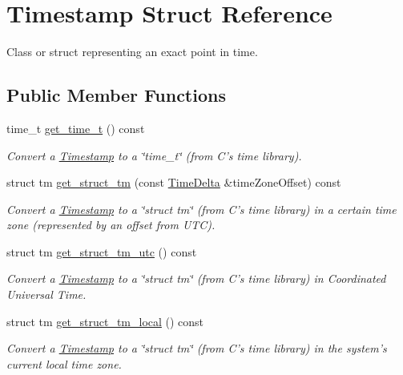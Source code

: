 \hypertarget{structTimestamp}{\section{Timestamp Struct Reference}
\label{structTimestamp}
}


Class or struct representing an exact point in time.  


\subsection*{Public Member Functions}
\begin{DoxyCompactItemize}
\item 
time\-\_\-t \hyperlink{structTimestamp_a54782bcc812fdeea952ec0e0880aac5f}{get\-\_\-time\-\_\-t} () const 
\begin{DoxyCompactList}\small\item\em Convert a \hyperlink{structTimestamp}{Timestamp} to a \char`\"{}time\-\_\-t\char`\"{} (from C's time library). \end{DoxyCompactList}\item 
struct tm \hyperlink{structTimestamp_ad75f04af1d0b038a2d43b117f72dee65}{get\-\_\-struct\-\_\-tm} (const \hyperlink{structTimeDelta}{Time\-Delta} \&time\-Zone\-Offset) const 
\begin{DoxyCompactList}\small\item\em Convert a \hyperlink{structTimestamp}{Timestamp} to a \char`\"{}struct tm\char`\"{} (from C's time library) in a certain time zone (represented by an offset from U\-T\-C). \end{DoxyCompactList}\item 
struct tm \hyperlink{structTimestamp_a763f8ab757e5d6cfb45c7931f75c5654}{get\-\_\-struct\-\_\-tm\-\_\-utc} () const 
\begin{DoxyCompactList}\small\item\em Convert a \hyperlink{structTimestamp}{Timestamp} to a \char`\"{}struct tm\char`\"{} (from C's time library) in Coordinated Universal Time. \end{DoxyCompactList}\item 
struct tm \hyperlink{structTimestamp_abc2107430b61e373e5ff84d16c1a097a}{get\-\_\-struct\-\_\-tm\-\_\-local} () const 
\begin{DoxyCompactList}\small\item\em Convert a \hyperlink{structTimestamp}{Timestamp} to a \char`\"{}struct tm\char`\"{} (from C's time library) in the system's current local time zone. \end{DoxyCompactList}\item 

\end{DoxyCompactItemize}
